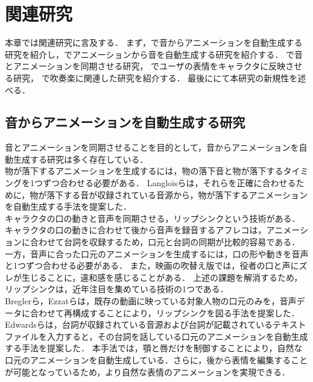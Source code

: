 \chapter{関連研究}
\label{chap:previousworks}
本章では関連研究に言及する．
まず，で音からアニメーションを自動生成する研究を紹介し，でアニメーションから音を自動生成する研究を紹介する．
で音とアニメーションを同期させる研究，
でユーザの表情をキャラクタに反映させる研究，
で吹奏楽に関連した研究を紹介する．
最後ににて本研究の新規性を述べる．

\section{音からアニメーションを自動生成する研究}\label{sec:generate_animation}
音とアニメーションを同期させることを目的として，音からアニメーションを自動生成する研究は多く存在している．\\
\indent
物が落下するアニメーションを生成するには，物の落下音と物が落下するタイミングを1つずつ合わせる必要がある．
Langloisら\cite{IFA}は，それらを正確に合わせるために，物が落下する音が収録されている音源から，物が落下するアニメーションを自動生成する手法を提案した．\\
%
\indent
キャラクタの口の動きと音声を同期させる，リップシンクという技術がある．
キャラクタの口の動きに合わせて後から音声を録音するアフレコは，アニメーションに合わせて台詞を収録するため，口元と台詞の同期が比較的容易である．
一方，音声に合った口元のアニメーションを生成するには，口の形や動きを音声と1つずつ合わせる必要がある．
また，映画の吹替え版では，役者の口と声にズレが生じることに，違和感を感じることがある．
上述の課題を解消するため，リップシンクは，近年注目を集めている技術の1つである．\\
\indent
Breglerら\cite{Bregler}，Ezzatら\cite{Ezzat}は，既存の動画に映っている対象人物の口元のみを，音声データに合わせて再構成することにより，リップシンクを図る手法を提案した．
Edwardsら\cite{JALI}は，台詞が収録されている音源および台詞が記載されているテキストファイルを入力すると，その台詞を話している口元のアニメーションを自動生成する手法を提案した．
本手法では，顎と唇だけを制御することにより，自然な口元のアニメーションを自動生成している．さらに，後から表情を編集することが可能となっているため，より自然な表情のアニメーションを実現できる．\\
